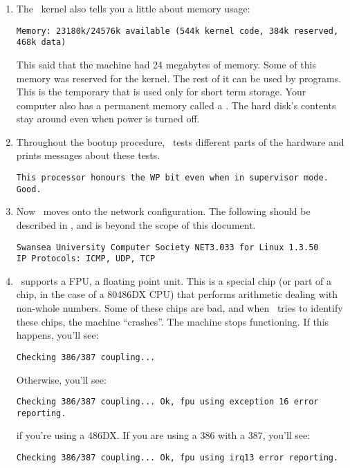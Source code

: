 \begin{enumerate}
\item The \linux\ kernel also tells you a little about memory usage:
  \begin{screen}\begin{verbatim}
Memory: 23180k/24576k available (544k kernel code, 384k reserved, 468k data)
\end{verbatim}\end{screen}
This said that the machine had 24 megabytes of
memory.  Some of this memory was reserved for the kernel.  The rest of
it can be used by programs.  This is the temporary  that
is used only for short term storage.  Your computer also has a
permanent memory called a .  The hard disk's
contents stay around even when power is turned off.

\item Throughout the bootup procedure, \linux\ tests different parts
  of the hardware and prints messages about these tests.
\begin{screen}\begin{verbatim}
This processor honours the WP bit even when in supervisor mode. Good.
\end{verbatim}\end{screen}

  \item Now \linux\ moves onto the network
    configuration. The following should be described
    in \ldpng, and is beyond the scope of this document.
\begin{screen}\begin{verbatim}
Swansea University Computer Society NET3.033 for Linux 1.3.50
IP Protocols: ICMP, UDP, TCP
\end{verbatim}\end{screen}

  \item \linux\ supports a FPU, a floating point unit. This
    is a special chip (or part of a chip, in the case of a 80486DX
    CPU) that performs arithmetic
    dealing with non-whole numbers. Some of these chips are bad, and
    when \linux\ tries to identify these chips, the machine
    ``crashes''.  The machine stops functioning. If this happens,
    you'll see:
\begin{screen}\begin{verbatim}
Checking 386/387 coupling...
\end{verbatim}\end{screen}
Otherwise, you'll see:
\begin{screen}\begin{verbatim}
Checking 386/387 coupling... Ok, fpu using exception 16 error reporting.
\end{verbatim}\end{screen}
if you're using a 486DX\@.  If you are using a 386 with a 387, you'll see:
\begin{screen}\begin{verbatim}
Checking 386/387 coupling... Ok, fpu using irq13 error reporting.
\end{verbatim}\end{screen}


\end{enumerate}
